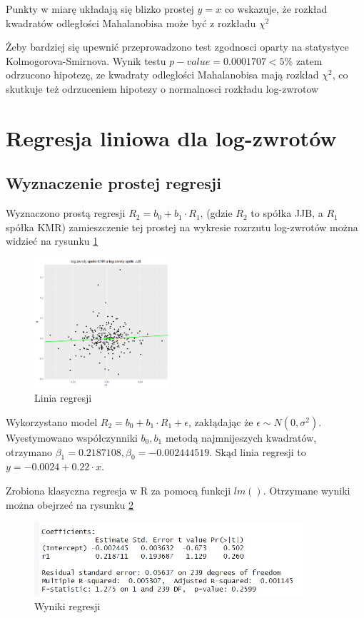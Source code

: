\documentclass[a4paper,11pt]{article}
\def\\{\hfill\break}
\begin{document}
Punkty w miarę układają się blizko prostej $y = x$ co wskazuje, że rozkład kwadratów odległości Mahalanobisa może być z rozkładu $ \chi^2$

\\
Żeby bardziej się upewnić przeprowadzono test zgodnosci oparty na statystyce Kolmogorova-Smirnova. Wynik testu $p-value = 0.0001707 < 5\%$ zatem odrzucono hipotezę, ze kwadraty odleglości Mahalanobisa mają rozkład $ \chi^2$, co skutkuje też odrzuceniem hipotezy o normalnosci rozkładu log-zwrotow

\section{Regresja liniowa dla log-zwrotów}
\subsection{Wyznaczenie prostej regresji}

Wyznaczono prostą regresji $R_{2} = b_{0} + b_{1} \cdot R_{1}$, (gdzie $R_2$ to spółka JJB, a $R_1$ spółka KMR) zamieszczenie tej prostej na wykresie rozrzutu log-zwrotów można widzieć na rysunku  \ref{fig:linia_regresji}

\begin{figure}[!htb]
	\centering
	\includegraphics[width=5cm]{linia_regresji.png}
	\caption{Linia regresji }
         \label{fig:linia_regresji}
\end{figure}

Wykorzystano model $R_{2} = b_{0} + b_{1} \cdot R_{1} + \epsilon $, zakłądając że $\epsilon \sim N(0, \sigma^2)$. Wyestymowano współczynniki $b_{0}, b_{1}$ metodą najmnijeszych kwadratów, otrzymano $\beta_{1} = 0.2187108, \beta_{0}=-0.002444519$. Skąd linia regresji to $y = -0.0024 + 0.22\cdot x$.

Zrobiona klasyczna regresja w R za pomocą funkcji $lm()$. Otrzymane wyniki można obejrzeć na rysunku \ref{fig:regresja}

\begin{figure}[!htb]
	\centering
	\includegraphics[width=10cm]{regresja.png}
	\caption{Wyniki regresji}
         \label{fig:regresja}
\end{figure}
\end{document}

